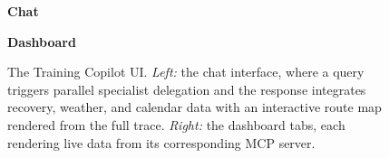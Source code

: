 \begin{figure}[ht]
\centering
\begin{minipage}{0.48\textwidth}
\centering
\textbf{\small Chat}\\[2pt]
\end{minipage}
\hfill
\begin{minipage}{0.48\textwidth}
\centering
\textbf{\small Dashboard}\\[2pt]
\end{minipage}
\caption[Chat and dashboard interfaces]{The Training Copilot UI. \textit{Left:} the chat interface, where a query triggers parallel specialist delegation and the response integrates recovery, weather, and calendar data with an interactive route map rendered from the full trace. \textit{Right:} the dashboard tabs, each rendering live data from its corresponding MCP server.}\label{fig:screenshot_ui_overview}
\end{figure}
